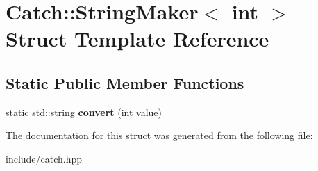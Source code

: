 \hypertarget{structCatch_1_1StringMaker_3_01int_01_4}{}\section{Catch\+:\+:String\+Maker$<$ int $>$ Struct Template Reference}
\label{structCatch_1_1StringMaker_3_01int_01_4}
\subsection*{Static Public Member Functions}
\begin{DoxyCompactItemize}
\item 
static std\+::string {\bfseries convert} (int value)\hypertarget{structCatch_1_1StringMaker_3_01int_01_4_aab096e55fb7283f6ad47b5ca277e22e8}{}\label{structCatch_1_1StringMaker_3_01int_01_4_aab096e55fb7283f6ad47b5ca277e22e8}

\end{DoxyCompactItemize}


The documentation for this struct was generated from the following file\+:\begin{DoxyCompactItemize}
\item 
include/catch.\+hpp\end{DoxyCompactItemize}
